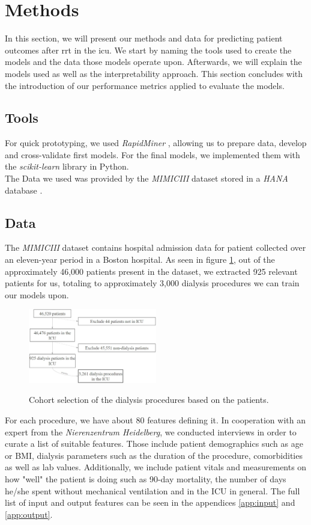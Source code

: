 \documentclass[conference,comsoc]{IEEEtran}
\begin{document}
\section{Methods}
\label{sec:methods}
In this section, we will present our methods and data for predicting patient outcomes after \gls{rrt} in the \gls{icu}.
We start by naming the tools used to create the models and the data those models operate upon.
Afterwards, we will explain the models used as well as the interpretability approach.
This section concludes with the introduction of our performance metrics applied to evaluate the models.

\subsection{Tools}
For quick prototyping, we used \emph{RapidMiner} \cite{RapidMiner}, allowing us to prepare data, develop and cross-validate first models. 
For the final models, we implemented them with the \emph{scikit-learn} library \cite{SKLearn} in Python. \\
The Data we used was provided by the \emph{MIMICIII} dataset \cite{Johnson2016} stored in a \emph{HANA} database \cite{Farber2012}.


\subsection{Data}
The \emph{MIMICIII} dataset contains hospital admission data for patient collected over an eleven-year period in a Boston hospital. 
As seen in figure \ref{fig:cohort}, out of the approximately 46,000 patients present in the dataset, we extracted 925 relevant patients for us, totaling to approximately 3,000 dialysis procedures we can train our models upon.

\begin{figure}[h]
	\includegraphics[width=0.5\textwidth]{cohort.jpg}
	\label{fig:cohort}
	\caption{Cohort selection of the dialysis procedures based on the patients.}
\end{figure}

For each procedure, we have about 80 features defining it.
In cooperation with an expert from the \emph{Nierenzentrum Heidelberg}, we conducted interviews in order to curate a list of suitable features.
Those include patient demographics such as age or BMI, dialysis parameters such as the duration of the procedure, comorbidities as well as lab values. 
Additionally, we include patient vitals and measurements on how "well" the patient is doing such as 90-day mortality, the number of days he/she spent without mechanical ventilation and in the ICU in general.
The full list of input and output features can be seen in the appendices \ref{app:input} and \ref{app:output}.
\end{document}
